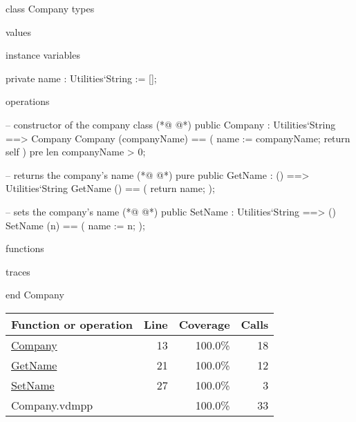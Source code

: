 \begin{vdmpp}[breaklines=true]
class Company
types

values

instance variables

 private name : Utilities`String := [];
 
operations

 -- constructor of the company class 
(*@
\label{Company:13}
@*)
  public Company :  Utilities`String ==> Company
    Company (companyName) == (
     name := companyName;
     return self
    )
    pre len companyName > 0;
    
  -- returns the company's name
(*@
\label{GetName:21}
@*)
  pure public GetName : () ==> Utilities`String
    GetName () == (
     return name;
    );
    
   -- sets the company's name
(*@
\label{SetName:27}
@*)
  public SetName : Utilities`String ==> ()
    SetName (n) == (
     name := n;
    );
    
functions

traces

end Company
\end{vdmpp}
\bigskip
\begin{longtable}{|l|r|r|r|}
\hline
Function or operation & Line & Coverage & Calls \\
\hline
\hline
\hyperref[Company:13]{Company} & 13&100.0\% & 18 \\
\hline
\hyperref[GetName:21]{GetName} & 21&100.0\% & 12 \\
\hline
\hyperref[SetName:27]{SetName} & 27&100.0\% & 3 \\
\hline
\hline
Company.vdmpp & & 100.0\% & 33 \\
\hline
\end{longtable}

